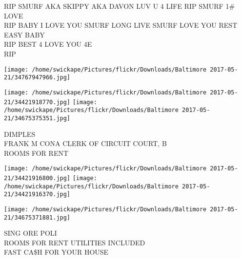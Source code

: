 \documentclass[10pt,letterpaper]{article}
\begin{document}
RIP SMURF AKA SKIPPY AKA DAVON LUV U 4 LIFE RIP SMURF 1\# LOVE\\
RIP BABY I LOVE YOU SMURF LONG LIVE SMURF LOVE YOU REST EASY BABY\\
RIP BEST 4 LOVE YOU 4E\\
RIP\\
\pagebreak

\texttt{[image: /home/swickape/Pictures/flickr/Downloads/Baltimore 2017-05-21/34767947966.jpg]}

\vspace{0.25in}
\texttt{[image: /home/swickape/Pictures/flickr/Downloads/Baltimore 2017-05-21/34421918770.jpg]}
\texttt{[image: /home/swickape/Pictures/flickr/Downloads/Baltimore 2017-05-21/34675375351.jpg]}

DIMPLES\\
FRANK M CONA CLERK OF CIRCUIT COURT, B\\
ROOMS FOR RENT\\
\pagebreak

\texttt{[image: /home/swickape/Pictures/flickr/Downloads/Baltimore 2017-05-21/34421916800.jpg]}
\texttt{[image: /home/swickape/Pictures/flickr/Downloads/Baltimore 2017-05-21/34421916370.jpg]}

\texttt{[image: /home/swickape/Pictures/flickr/Downloads/Baltimore 2017-05-21/34675371881.jpg]}

SING ORE POLI\\
ROOMS FOR RENT UTILITIES INCLUDED\\
FAST CA\$H FOR YOUR HOUSE\\
\pagebreak
\end{document}
